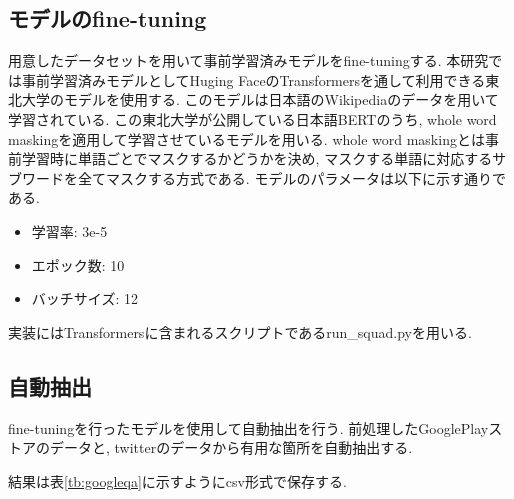 \subsection{モデルのfine-tuning}
用意したデータセットを用いて事前学習済みモデルをfine-tuningする. 本研究では事前学習済みモデルとしてHuging FaceのTransformersを通して利用できる東北大学のモデル\cite{tohoku}を使用する. このモデルは日本語のWikipediaのデータを用いて学習されている\cite{tohoku}. 
この東北大学が公開している日本語BERTのうち, whole word maskingを適用して学習させているモデル\cite{masking}を用いる. whole word maskingとは事前学習時に単語ごとでマスクするかどうかを決め, マスクする単語に対応するサブワードを全てマスクする方式である. モデルのパラメータは以下に示す通りである. 
\begin{itemize}
  \item 学習率: 3e-5
  \item エポック数: 10
  \item バッチサイズ: 12
\end{itemize}

実装にはTransformersに含まれるスクリプトであるrun\_squad.pyを用いる. 

\subsection{自動抽出}
fine-tuningを行ったモデルを使用して自動抽出を行う. 前処理したGooglePlayストアのデータと, twitterのデータから有用な箇所を自動抽出する. 

結果は表\ref{tb:googleqa}に示すようにcsv形式で保存する. 

